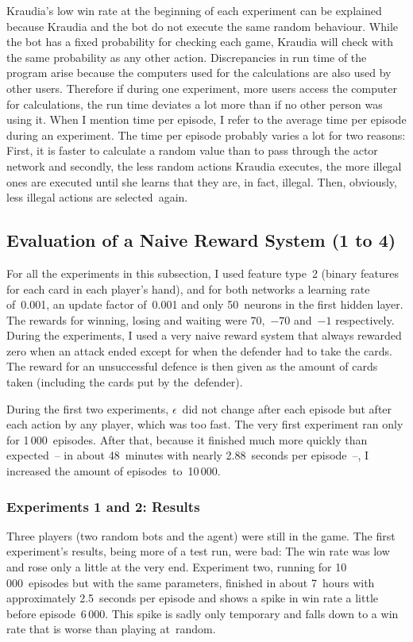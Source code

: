 \documentclass[a4paper,titlepage]{article}
\begin{document}
Kraudia's low win rate at the beginning of each experiment can be explained because Kraudia and the bot do not execute the same random behaviour. While the bot has a fixed probability for checking each game, Kraudia will check with the same probability as any other action. Discrepancies in run time of the program arise because the computers used for the calculations are also used by other users. Therefore if during one experiment, more users access the computer for calculations, the run time deviates a lot more than if no other person was using it. When I mention time per episode, I refer to the average time per episode during an experiment. The time per episode probably varies a lot for two reasons: First, it is faster to calculate a random value than to pass through the actor network and secondly, the less random actions Kraudia executes, the more illegal ones are executed until she learns that they are, in fact, illegal. Then, obviously, less illegal actions are selected~again.

\subsection{Evaluation of a Naive Reward System (1 to 4)}

For all the experiments in this subsection, I used feature type~2 (binary features for each card in each player's hand), and for both networks a learning rate of~0.001, an update factor of~0.001 and only 50~neurons in the first hidden layer. The rewards for winning, losing and waiting were 70,~$-70$ and~$-1$ respectively. During the experiments, I used a very naive reward system that always rewarded zero when an attack ended except for when the defender had to take the cards. The reward for an unsuccessful defence is then given as the amount of cards taken (including the cards put by the~defender).

During the first two experiments, $\epsilon$~did not change after each episode but after each action by any player, which was too fast.
The very first experiment ran only for 1\,000~episodes. After that, because it finished much more quickly than expected~-- in about 48~minutes with nearly 2.88~seconds per episode~--, I increased the amount of episodes~to~10\,000.

\subsubsection*{Experiments 1 and 2: Results}

Three players (two random bots and the agent) were still in the game. The first experiment's results, being more of a test run, were bad: The win rate was low and rose only a little at the very end. Experiment two, running for 10\,000~episodes but with the same parameters, finished in about 7~hours with approximately 2.5~seconds per episode and shows a spike in win rate a little before episode~6\,000. This spike is sadly only temporary and falls down to a win rate that is worse than playing at~random.
\end{document}
